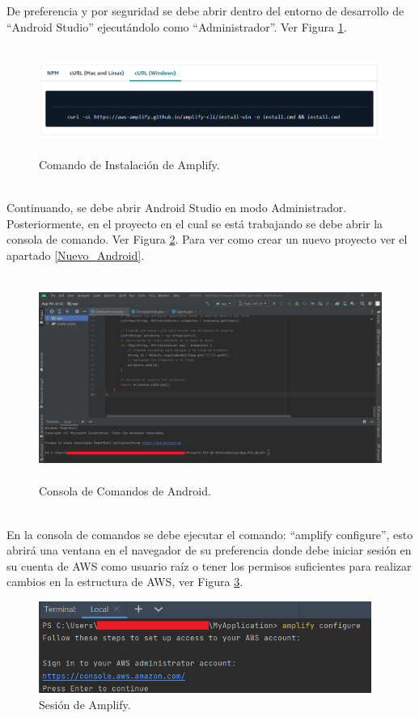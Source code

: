 \documentclass[a4paper,10pt, oneside, titlepage]{article}
\begin{document}
	\indent De preferencia y por seguridad se debe abrir dentro del entorno de desarrollo de ``Android Studio'' ejecutándolo como ``Administrador''. Ver Figura \ref{Comando_Amplify}.
	\begin{figure}[!h]
		\centering
		\includegraphics[width = 1\linewidth, height = 3.5cm]{Comando_Amplify.png}
		\caption{Comando de Instalación de Amplify.}
		\label{Comando_Amplify}
	\end{figure} \\
	\indent Continuando, se debe abrir Android Studio en modo Administrador. Posteriormente, en el proyecto en el cual se está trabajando se debe abrir la consola de comando. Ver Figura \ref{Consola_Android}. Para ver como crear un nuevo proyecto ver el apartado \ref{Nuevo_Android}.
	\begin{figure}[!h]
		\centering
		\includegraphics[width = 1\linewidth, height = 6.7cm]{Consola_Android.png}
		\caption{Consola de Comandos de Android.}
		\label{Consola_Android}
	\end{figure} \\
	\indent En la consola de comandos se debe ejecutar el comando: ``amplify configure'', esto abrirá una ventana en el navegador de su preferencia donde debe iniciar sesión en su cuenta de AWS como usuario raíz o tener los permisos suficientes para realizar cambios en la estructura de AWS, ver Figura \ref{Sesion_Amplify}.
	\begin{figure}[!h]
		\centering
		\includegraphics[width = 1\linewidth, height = 3cm]{Sesion_Amplify.png}
		\caption{Sesión de Amplify.}
		\label{Sesion_Amplify}
	\end{figure} \\
\end{document}

